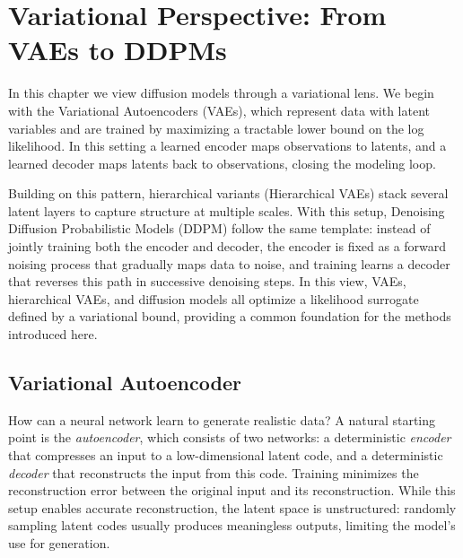 \chapter{Variational Perspective: From VAEs to DDPMs}\label{ch:variational}


In this chapter we view diffusion models through a variational lens. We begin with the Variational Autoencoders (VAEs), which represent data with latent variables and are trained by maximizing a tractable lower bound on the log likelihood. In this setting a learned encoder maps observations to latents, and a learned decoder maps latents back to observations, closing the modeling loop. 

Building on this pattern, hierarchical variants (Hierarchical VAEs) stack several latent layers to capture structure at multiple scales. With this setup, Denoising Diffusion Probabilistic Models (DDPM) follow the same template: instead of jointly training both the encoder and decoder, the encoder is fixed as a forward noising process that gradually maps data to noise, and training learns a decoder that reverses this path in successive denoising steps. In this view, VAEs, hierarchical VAEs, and diffusion models all optimize a likelihood surrogate defined by a variational bound, providing a common foundation for the methods introduced here.





\newpage
\section{Variational Autoencoder}\label{sec:vae}
How can a neural network learn to generate realistic data?  
A natural starting point is the \emph{autoencoder}, which consists of two networks:  
a deterministic \emph{encoder} that compresses an input to a low-dimensional latent code, and a deterministic \emph{decoder} that reconstructs the input from this code.  
Training minimizes the reconstruction error between the original input and its reconstruction.  
While this setup enables accurate reconstruction, the latent space is unstructured: randomly sampling latent codes usually produces meaningless outputs, limiting the model’s use for generation.




